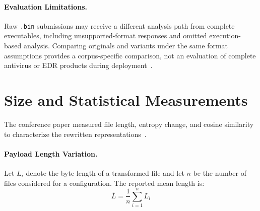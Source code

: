 \documentclass[runningheads]{llncs}
\begin{document}
\paragraph{Evaluation Limitations.}
Raw \texttt{.bin} submissions may receive a different analysis path from
complete executables, including unsupported-format responses and omitted
execution-based analysis. Comparing originals and variants under the
same format assumptions provides a corpus-specific comparison, not an
evaluation of complete antivirus or EDR products during deployment~\cite{zone_secrypt_2026}.

\section{Size and Statistical Measurements}\label{sect:var_metrics}
The conference paper measured file length, entropy change, and cosine
similarity to characterize the rewritten representations~\cite{zone_secrypt_2026}.

\paragraph{Payload Length Variation.}
Let $L_i$ denote the byte length of a transformed file and let $n$ be the number of files considered for a configuration. The reported mean length is:
\[
\overline{L} = \frac{1}{n} \sum_{i=1}^{n} L_i
\]
\end{document}
